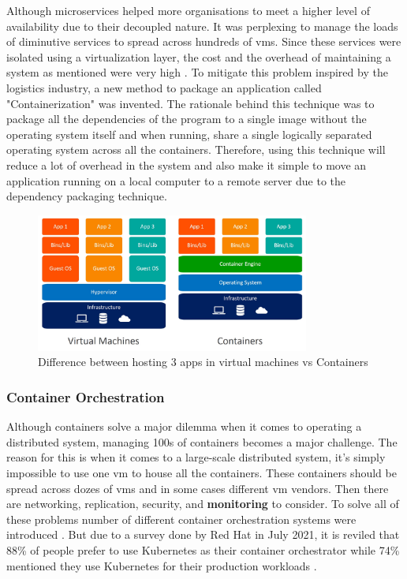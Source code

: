 Although microservices helped more organisations to meet a higher level of availability due to their decoupled nature. It was perplexing to manage the loads of diminutive services to spread across hundreds of \acp{vm}. Since these services were isolated using a virtualization layer, the cost and the overhead of maintaining a system as mentioned were very high \citep{dua2014virtualization}. To mitigate this problem inspired by the logistics industry, a new method to package an application called "Containerization" was invented. The rationale behind this technique was to package all the dependencies of the program to a single image without the operating system itself and when running, share a single logically separated operating system across all the containers. Therefore, using this technique will reduce a lot of overhead in the system and also make it simple to move an application running on a local computer to a remote server due to the dependency packaging technique.

\begin{figure}[H]
    \includegraphics[width=9cm]{assets/literature-review/containers-vs-virtual-machines.jpg}
    \caption{Difference between hosting 3 apps in virtual machines vs Containers \citep{Dockervs91:online}}
\end{figure}

\subsubsection{Container Orchestration}

Although containers solve a major dilemma when it comes to operating a distributed system, managing 100s of containers becomes a major challenge. The reason for this is when it comes to a large-scale distributed system, it's simply impossible to use one \ac{vm} to house all the containers. These containers should be spread across dozes of \acp{vm} and in some cases different \ac{vm} vendors. Then there are networking, replication, security, and \textbf{monitoring} to consider. To solve all of these problems number of different container orchestration systems were introduced \citep{ElasticityCloudComputing}. But due to a survey done by Red Hat in July 2021, it is reviled that 88\% of people prefer to use Kubernetes as their container orchestrator while 74\% mentioned they use Kubernetes for their production workloads \citep{Kubernet59:online}.

